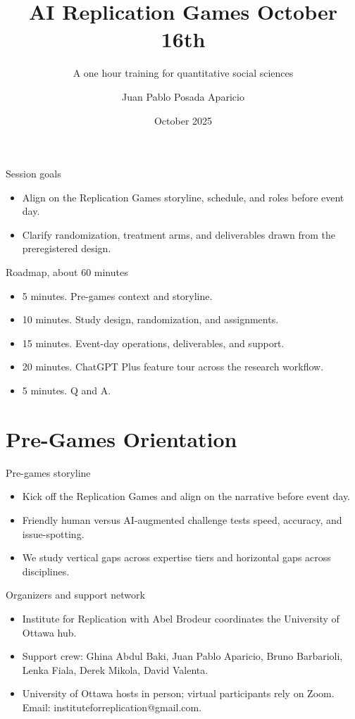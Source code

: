 \documentclass[aspectratio=169,professionalfonts]{beamer}
\title{AI Replication Games October 16th}
\subtitle{A one hour training for quantitative social sciences}
\author{Juan Pablo Posada Aparicio}
\institute{Institute for Replication, University of Ottawa}
\date{October 2025}
\begin{document}
\begin{frame}
  \titlepage
\end{frame}

\begin{frame}{Session goals}
  \begin{itemize}
    \item Align on the Replication Games storyline, schedule, and roles before event day.
    \item Clarify randomization, treatment arms, and deliverables drawn from the preregistered design.
  \end{itemize}
\end{frame}

\begin{frame}{Roadmap, about 60 minutes}
  \begin{itemize}
    \item 5 minutes. Pre-games context and storyline.
    \item 10 minutes. Study design, randomization, and assignments.
    \item 15 minutes. Event-day operations, deliverables, and support.
    \item 20 minutes. ChatGPT Plus feature tour across the research workflow.
    \item 5 minutes. Q and A.

  \end{itemize}
\end{frame}

\section{Pre-Games Orientation}

\begin{frame}{Pre-games storyline}
  \begin{itemize}
    \item Kick off the Replication Games and align on the narrative before event day.
    \item Friendly human versus AI-augmented challenge tests speed, accuracy, and issue-spotting.
    \item We study vertical gaps across expertise tiers and horizontal gaps across disciplines.
  \end{itemize}
\end{frame}

\begin{frame}{Organizers and support network}
  \begin{itemize}
    \item Institute for Replication with Abel Brodeur coordinates the University of Ottawa hub.
    \item Support crew: Ghina Abdul Baki, Juan Pablo Aparicio, Bruno Barbarioli, Lenka Fiala, Derek Mikola, David Valenta.
    \item University of Ottawa hosts in person; virtual participants rely on Zoom. Email: instituteforreplication@gmail.com.
  \end{itemize}
\end{frame}
\end{document}

